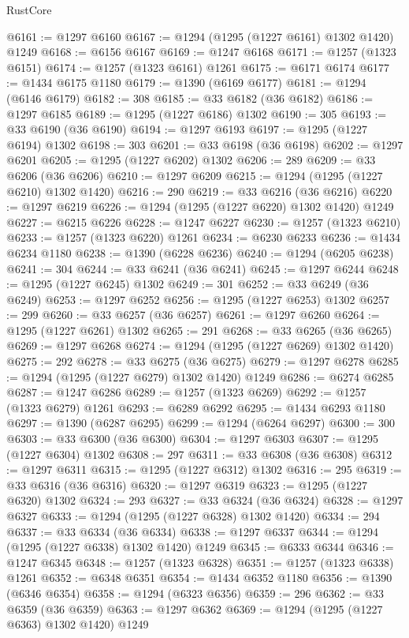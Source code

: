 \begin{lexlean}{RustCore}
\begin{coremodule}
@6161 := @1297 @6160
@6167 := @1294 (@1295 (@1227 @6161) @1302 @1420) @1249
@6168 := @6156 @6167
@6169 := @1247 @6168
@6171 := @1257 (@1323 @6151)
@6174 := @1257 (@1323 @6161) @1261
@6175 := @6171 @6174
@6177 := @1434 @6175 @1180
@6179 := @1390 (@6169 @6177)
@6181 := @1294 (@6146 @6179)
@6182 := 308
@6185 := @33 @6182 (@36 @6182)
@6186 := @1297 @6185
@6189 := @1295 (@1227 @6186) @1302
@6190 := 305
@6193 := @33 @6190 (@36 @6190)
@6194 := @1297 @6193
@6197 := @1295 (@1227 @6194) @1302
@6198 := 303
@6201 := @33 @6198 (@36 @6198)
@6202 := @1297 @6201
@6205 := @1295 (@1227 @6202) @1302
@6206 := 289
@6209 := @33 @6206 (@36 @6206)
@6210 := @1297 @6209
@6215 := @1294 (@1295 (@1227 @6210) @1302 @1420)
@6216 := 290
@6219 := @33 @6216 (@36 @6216)
@6220 := @1297 @6219
@6226 := @1294 (@1295 (@1227 @6220) @1302 @1420) @1249
@6227 := @6215 @6226
@6228 := @1247 @6227
@6230 := @1257 (@1323 @6210)
@6233 := @1257 (@1323 @6220) @1261
@6234 := @6230 @6233
@6236 := @1434 @6234 @1180
@6238 := @1390 (@6228 @6236)
@6240 := @1294 (@6205 @6238)
@6241 := 304
@6244 := @33 @6241 (@36 @6241)
@6245 := @1297 @6244
@6248 := @1295 (@1227 @6245) @1302
@6249 := 301
@6252 := @33 @6249 (@36 @6249)
@6253 := @1297 @6252
@6256 := @1295 (@1227 @6253) @1302
@6257 := 299
@6260 := @33 @6257 (@36 @6257)
@6261 := @1297 @6260
@6264 := @1295 (@1227 @6261) @1302
@6265 := 291
@6268 := @33 @6265 (@36 @6265)
@6269 := @1297 @6268
@6274 := @1294 (@1295 (@1227 @6269) @1302 @1420)
@6275 := 292
@6278 := @33 @6275 (@36 @6275)
@6279 := @1297 @6278
@6285 := @1294 (@1295 (@1227 @6279) @1302 @1420) @1249
@6286 := @6274 @6285
@6287 := @1247 @6286
@6289 := @1257 (@1323 @6269)
@6292 := @1257 (@1323 @6279) @1261
@6293 := @6289 @6292
@6295 := @1434 @6293 @1180
@6297 := @1390 (@6287 @6295)
@6299 := @1294 (@6264 @6297)
@6300 := 300
@6303 := @33 @6300 (@36 @6300)
@6304 := @1297 @6303
@6307 := @1295 (@1227 @6304) @1302
@6308 := 297
@6311 := @33 @6308 (@36 @6308)
@6312 := @1297 @6311
@6315 := @1295 (@1227 @6312) @1302
@6316 := 295
@6319 := @33 @6316 (@36 @6316)
@6320 := @1297 @6319
@6323 := @1295 (@1227 @6320) @1302
@6324 := 293
@6327 := @33 @6324 (@36 @6324)
@6328 := @1297 @6327
@6333 := @1294 (@1295 (@1227 @6328) @1302 @1420)
@6334 := 294
@6337 := @33 @6334 (@36 @6334)
@6338 := @1297 @6337
@6344 := @1294 (@1295 (@1227 @6338) @1302 @1420) @1249
@6345 := @6333 @6344
@6346 := @1247 @6345
@6348 := @1257 (@1323 @6328)
@6351 := @1257 (@1323 @6338) @1261
@6352 := @6348 @6351
@6354 := @1434 @6352 @1180
@6356 := @1390 (@6346 @6354)
@6358 := @1294 (@6323 @6356)
@6359 := 296
@6362 := @33 @6359 (@36 @6359)
@6363 := @1297 @6362
@6369 := @1294 (@1295 (@1227 @6363) @1302 @1420) @1249

\end{coremodule}
\end{lexlean}
